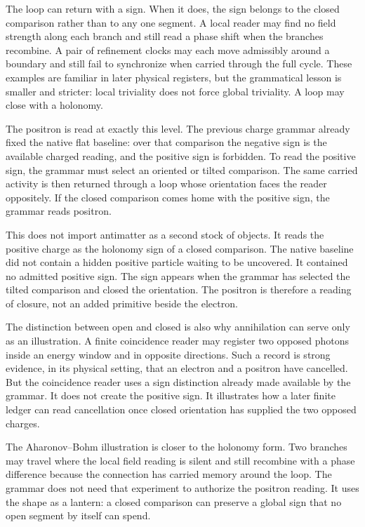The loop can return with a sign. When it does, the sign belongs to the closed
comparison rather than to any one segment. A local reader may find no field
strength along each branch and still read a phase shift when the branches
recombine. A pair of refinement clocks may each move admissibly around a
boundary and still fail to synchronize when carried through the full cycle.
These examples are familiar in later physical registers, but the
grammatical lesson is smaller and stricter: local triviality does not force
global triviality. A loop may close with a holonomy.

The positron is read at exactly this level. The previous charge grammar
already fixed the native flat baseline: over that comparison the negative
sign is the available charged reading, and the positive sign is forbidden.
To read the positive sign, the grammar must select an oriented or tilted
comparison. The same carried activity is then returned through a loop whose
orientation faces the reader oppositely. If the closed comparison comes home
with the positive sign, the grammar reads positron.

This does not import antimatter as a second stock of objects. It reads the
positive charge as the holonomy sign of a closed comparison. The native
baseline did not contain a hidden positive particle waiting to be uncovered.
It contained no admitted positive sign. The sign appears when the grammar
has selected the tilted comparison and closed the orientation. The positron
is therefore a reading of closure, not an added primitive beside the
electron.

The distinction between open and closed is also why annihilation can serve
only as an illustration. A finite coincidence reader may register two
opposed photons inside an energy window and in opposite directions. Such a
record is strong evidence, in its physical setting, that an electron and a
positron have cancelled. But the coincidence reader uses a sign distinction
already made available by the grammar. It does not create the positive sign.
It illustrates how a later finite ledger can read cancellation once closed
orientation has supplied the two opposed charges.

The Aharonov--Bohm illustration is closer to the holonomy form. Two branches
may travel where the local field reading is silent and still recombine with
a phase difference because the connection has carried memory around the
loop. The grammar does not need that experiment to authorize the positron
reading. It uses the shape as a lantern: a closed comparison can preserve a
global sign that no open segment by itself can spend.

